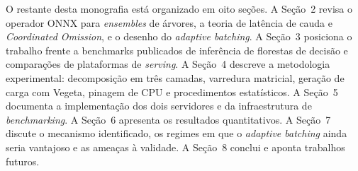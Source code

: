 O restante desta monografia está organizado em oito seções. A Seção~2
revisa o operador ONNX para \textit{ensembles} de árvores, a teoria de
latência de cauda e \textit{Coordinated Omission}, e o desenho do
\textit{adaptive batching}. A Seção~3 posiciona o trabalho frente a
benchmarks publicados de inferência de florestas de decisão e comparações
de plataformas de \textit{serving}. A Seção~4 descreve a metodologia
experimental: decomposição em três camadas, varredura matricial, geração
de carga com Vegeta, pinagem de CPU e procedimentos estatísticos. A
Seção~5 documenta a implementação dos dois servidores e da infraestrutura
de \textit{benchmarking}. A Seção~6 apresenta os resultados quantitativos. A
Seção~7 discute o mecanismo identificado, os regimes em que o
\textit{adaptive batching} ainda seria vantajoso e as ameaças à validade. A
Seção~8 conclui e aponta trabalhos futuros.


